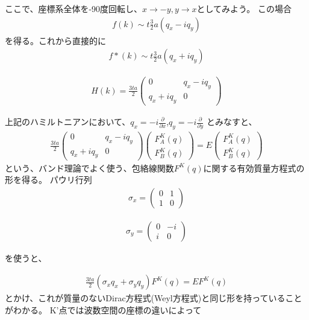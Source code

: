 \documentclass{article}
\begin{document}
ここで、座標系全体を-90度回転し、$x\rightarrow-y, y\rightarrow x$としてみよう。
この場合
\begin{eqnarray}
f(k)\sim t\frac{3}{2}a \left( q_x-iq_y\right)
\end{eqnarray}
を得る。これから直接的に
\begin{eqnarray}
f*(k)\sim t\frac{3}{2}a \left( q_x+iq_y\right)
\end{eqnarray}

\begin{eqnarray}
H(k)=\frac{3ta}{2} \left( 
 \begin{array}{cc}
	0 &  q_x-iq_y \\
	q_x+iq_y & 0
 \end{array}
\right)
\end{eqnarray}


上記のハミルトニアンにおいて、$q_x=-i\frac{\partial}{\partial x}$,$q_y=-i\frac{\partial}{\partial y}$
とみなすと、
\begin{eqnarray}
\frac{3ta}{2} \left( 
 \begin{array}{cc}
	0 &  q_x-iq_y \\
	q_x+iq_y & 0
 \end{array}
\right)\left( 
 \begin{array}{c}
	F^K_A(q) \\
	F^K_B(q) 
 \end{array} 
\right)=E 
\left( 
 \begin{array}{c}
	F^K_A(q) \\
	F^K_B(q) 
 \end{array} 
\right)
\end{eqnarray}
という、バンド理論でよく使う、包絡線関数$F^K(q)$に関する有効質量方程式の形を得る。
パウリ行列
\begin{eqnarray}
\sigma_x= \left( 
 \begin{array}{cc}
	0 &  1 \\
	1 & 0
 \end{array}
\right)
\end{eqnarray}

\begin{eqnarray}
\sigma_y= \left( 
 \begin{array}{cc}
	0 &  -i \\
	i & 0
 \end{array}
\right)
\end{eqnarray}

を使うと、

\begin{eqnarray}
\frac{3ta}{2} \left( 
\sigma_x q_x+\sigma_y q_y
\right)F^K(q)=E F^K(q)
\end{eqnarray}
とかけ、これが質量のないDirac方程式(Weyl方程式)と同じ形を持っていることがわかる。
K'点では波数空間の座標の違いによって
\end{document}
